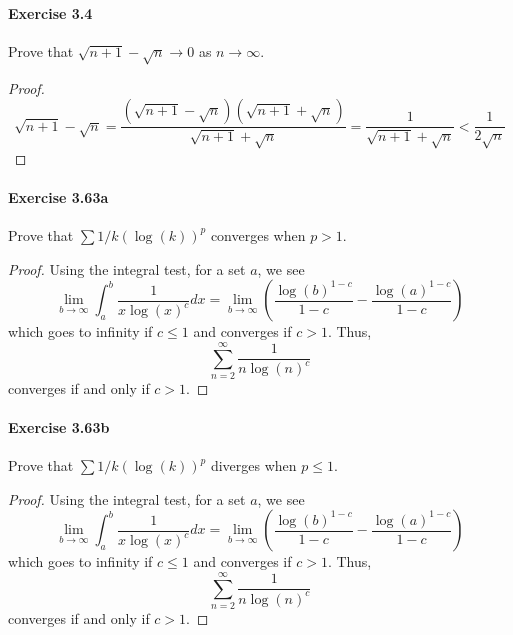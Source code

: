 \documentclass{article}
\begin{document}
\paragraph{Exercise 3.4} Prove that $\sqrt{n+1}-\sqrt{n} \rightarrow 0$ as $n \rightarrow \infty$.
\begin{proof}
    $$
\sqrt{n+1}-\sqrt{n}=\frac{(\sqrt{n+1}-\sqrt{n})(\sqrt{n+1}+\sqrt{n})}{\sqrt{n+1}+\sqrt{n}}=\frac{1}{\sqrt{n+1}+\sqrt{n}}<\frac{1}{2 \sqrt{n}}
$$
\end{proof}


\paragraph{Exercise 3.63a} Prove that $\sum 1/k(\log(k))^p$ converges when $p > 1$.
\begin{proof}
    Using the integral test, for a set $a$, we see
$$
\lim _{b \rightarrow \infty} \int_a^b \frac{1}{x \log (x)^c} d x=\lim _{b \rightarrow \infty}\left(\frac{\log (b)^{1-c}}{1-c}-\frac{\log (a)^{1-c}}{1-c}\right)
$$
which goes to infinity if $c \leq 1$ and converges if $c>1$. Thus,
$$
\sum_{n=2}^{\infty} \frac{1}{n \log (n)^c}
$$
converges if and only if $c>1$. 
\end{proof}



\paragraph{Exercise 3.63b} Prove that $\sum 1/k(\log(k))^p$ diverges when $p \leq 1$.
\begin{proof} 
    Using the integral test, for a set $a$, we see
$$
\lim _{b \rightarrow \infty} \int_a^b \frac{1}{x \log (x)^c} d x=\lim _{b \rightarrow \infty}\left(\frac{\log (b)^{1-c}}{1-c}-\frac{\log (a)^{1-c}}{1-c}\right)
$$
which goes to infinity if $c \leq 1$ and converges if $c>1$. Thus,
$$
\sum_{n=2}^{\infty} \frac{1}{n \log (n)^c}
$$
converges if and only if $c>1$. 
\end{proof}
\end{document}
